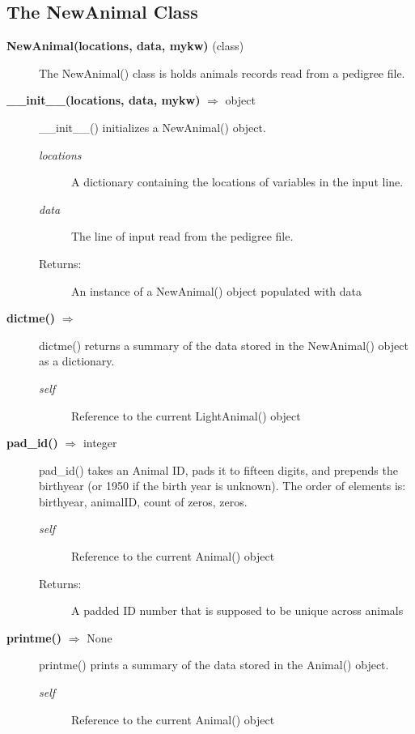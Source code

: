 \subsection*{The NewAnimal Class}
\begin{description}
\item[\textbf{NewAnimal(locations, data, mykw)} (class)]
The NewAnimal() class is holds animals records read from a pedigree file.

\item[\textbf{\_\_init\_\_(locations, data, mykw)} $\Rightarrow$ object]
\_\_init\_\_() initializes a NewAnimal() object.
\begin{description}
\item[\emph{locations}] A dictionary containing the locations of variables in the input line.
\item[\emph{data}] The line of input read from the pedigree file.
\item[Returns:] An instance of a NewAnimal() object populated with data
\end{description}

\item[\textbf{dictme()} $\Rightarrow$]
dictme() returns a summary of the data stored in the NewAnimal() object as a dictionary.
\begin{description}
\item[\emph{self}] Reference to the current LightAnimal() object
\end{description}

\item[\textbf{pad\_id()} $\Rightarrow$ integer]
pad\_id() takes an Animal ID, pads it to fifteen digits, and prepends the birthyear (or 1950 if the birth year is unknown). The order of elements is: birthyear, animalID, count of zeros, zeros.
\begin{description}
\item[\emph{self}] Reference to the current Animal() object
\item[Returns:] A padded ID number that is supposed to be unique across animals
\end{description}

\item[\textbf{printme()} $\Rightarrow$ None]
printme() prints a summary of the data stored in the Animal() object.
\begin{description}
\item[\emph{self}] Reference to the current Animal() object
\end{description}



\end{description}
